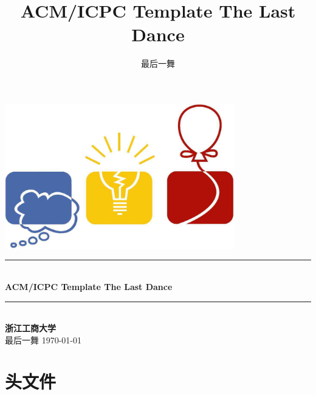 \documentclass[twoside]{article}
\title{ACM/ICPC Template The Last Dance}
\author{最后一舞}
\newcommand{\HRule}{\rule{\linewidth}{0.5mm}}
\begin{document}
\small
\begin{titlepage}
\begin{center}
\vspace*{0.5cm}\includegraphics[width=0.75\textwidth]{logo.jpg} \\ [2cm]
\HRule \\ [1cm]
\textbf{\Huge{ACM/ICPC Template The Last Dance}} \\ [0.5cm]
\HRule \\ [4cm]
\textbf{\Huge{浙江工商大学}} \\ [1cm]
\LARGE{最后一舞}
\vfill
\Large{\today}
\end{center}
\clearpage
\end{titlepage}
\tableofcontents\clearpage
\pagestyle{fancy}
\lfoot{}
\cfoot{\thepage}\rfoot{}
\setcounter{section}{-1}
\setcounter{page}{1}
\clearpage\section{头文件}
\end{document}
